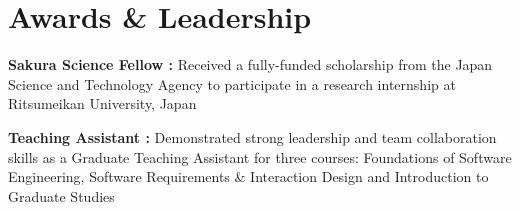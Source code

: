 \documentclass[letterpaper]{article}
\makeatletter
\newcommand{\resumeItemWithoutTitle}[1]{
  \item\small{
    {#1 \vspace{-2pt}}
  }
}
\newcommand{\shortSection}[1]{
    \vspace{-6pt}
    \section{#1}
}
\newcommand{\projectHeading}[3]{
  \begin{tabular*}{\textwidth}{l@{\extracolsep{\fill}}r}
        \textbf{#1} 
        \hspace{-2pt} $\vert$ \hspace{-2pt} \small{\textit{#2}} 
        & 
        \textit{#3} \\
    \end{tabular*}\vspace{-2pt}
}
\newcommand*{\skill}[2]{
  \textbf{#1 : }#2 \\
  \vspace{1pt}
}
\newcommand{\resumeItemListStart}{\begin{itemize}}
\newcommand{\resumeItemListEnd}{\end{itemize}}
\makeatother
\begin{document}


\shortSection{Awards \& Leadership}
\skill{Sakura Science Fellow}{Received a fully-funded scholarship from the Japan Science and Technology Agency to participate in a research internship at Ritsumeikan University, Japan}
\skill{Teaching Assistant}{Demonstrated strong leadership and team collaboration skills as a Graduate Teaching Assistant for three courses: Foundations of Software Engineering, Software Requirements \& Interaction Design and Introduction to Graduate Studies}
\end{document}
